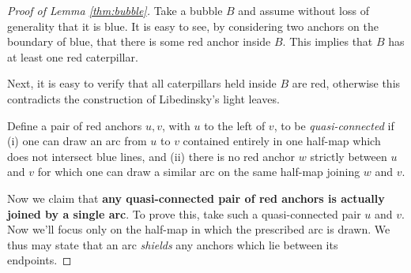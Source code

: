 \begin{proof}[Proof of Lemma \ref{thm:bubble}]
	Take a bubble $B$ and assume without loss of generality that it is blue.  It is easy to see, by considering two anchors on the boundary of blue, that there is some red anchor inside $B$.  This implies that $B$ has at least one red caterpillar.

	Next, it is easy to verify that all caterpillars held inside $B$ are red, otherwise this contradicts the construction of Libedinsky's light leaves.

	Define a pair of red anchors $u, v$, with $u$ to the left of $v$, to be \emph{quasi-connected} if (i) one can draw an arc from $u$ to $v$ contained entirely in one half-map which does not intersect blue lines, and (ii) there is no red anchor $w$ strictly between $u$ and $v$ for which one can draw a similar arc on the same half-map joining $w$ and $v$.

	Now we claim that \textbf{any quasi-connected pair of red anchors is actually joined by a single arc}.  To prove this, take such a quasi-connected pair $u$ and $v$.  Now we'll focus only on the half-map in which the prescribed arc is drawn.  We thus may state that an arc \emph{shields} any anchors which lie between its endpoints.
	

\end{proof}
